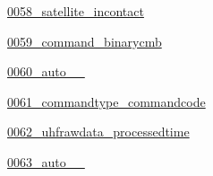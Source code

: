 \begin{DoxyCompactItemize}
 \hyperlink{namespace_ground_segment_1_1migrations_1_10058__satellite__incontact}{0058\+\_\+satellite\+\_\+incontact}
\item 
 \hyperlink{namespace_ground_segment_1_1migrations_1_10059__command__binarycmb}{0059\+\_\+command\+\_\+binarycmb}
\item 
 \hyperlink{namespace_ground_segment_1_1migrations_1_10060__auto__20170401__1620}{0060\+\_\+auto\+\_\+\_}
\item 
 \hyperlink{namespace_ground_segment_1_1migrations_1_10061__commandtype__commandcode}{0061\+\_\+commandtype\+\_\+commandcode}
\item 
 \hyperlink{namespace_ground_segment_1_1migrations_1_10062__uhfrawdata__processedtime}{0062\+\_\+uhfrawdata\+\_\+processedtime}
\item 
 \hyperlink{namespace_ground_segment_1_1migrations_1_10063__auto__20170601__1929}{0063\+\_\+auto\+\_\+\_}
\end{DoxyCompactItemize}
